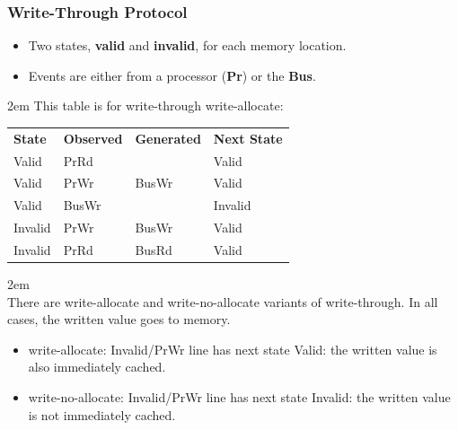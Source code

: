 \begin{frame}
  \frametitle{Write-Through Protocol}

  
  \begin{itemize}
    \item Two states, {\bf valid} and {\bf invalid}, for each memory location.
    \item Events are either from a processor ({\bf Pr}) or the {\bf Bus}.
  \end{itemize}
  \vfill
  \begin{changemargin}{2em}
  This table is for write-through write-allocate:
  \end{changemargin}
  \begin{center}
    \begin{tabular}{llll}
      {\bf State} & {\bf Observed} & {\bf Generated} & {\bf Next State}\\
      Valid   & PrRd  &       & Valid\\
      Valid   & PrWr  & BusWr & Valid\\
      Valid   & BusWr &       & Invalid\\
      Invalid & PrWr  & BusWr & Valid\\
      Invalid & PrRd  & BusRd & Valid\\
    \end{tabular}
  \begin{changemargin}{2em}
  ~\\
  There are write-allocate and write-no-allocate variants of write-through. In all cases, the written value goes to memory.\\[0em]
  \begin{itemize}
  \item  write-allocate: Invalid/PrWr line has next state Valid: the written value is also immediately cached.
  \item  write-no-allocate: Invalid/PrWr line has next state Invalid: the written value is not immediately cached.
  \end{itemize}
  \end{changemargin}
  \end{center}
  
\end{frame}

